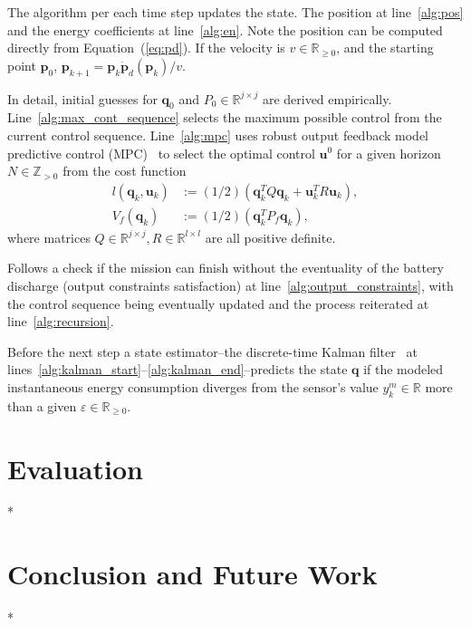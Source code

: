 \documentclass[letterpaper,10pt,conference]{ieeeconf}
\theoremstyle{definition}
\begin{document}
The algorithm per each time step updates the state. The position at line~\ref{alg:pos} and the energy coefficients at line~\ref{alg:en}. Note the position can be computed directly from Equation~(\ref{eq:pd}). If the velocity is $v\in\mathbb{R}_{\geq 0}$, and the starting point $\mathbf{p}_0$, $\mathbf{p}_{k+1}=\mathbf{p}_k\dot{\mathbf{p}}_d(\mathbf{p}_k)/v$.
  
In detail, initial guesses for $\mathbf{q}_0$ and $P_0\in\mathbb{R}^{j\times j}$ are derived empirically. Line~\ref{alg:max_cont_sequence} selects the maximum possible control from the current control sequence. Line~\ref{alg:mpc} uses robust output feedback model predictive control (MPC)~\cite{rawlings2017model} to select the optimal control $\mathbf{u}^0$ for a given horizon $N\in\mathbb{Z}_{>0}$ from the cost function
\begin{equation}\begin{split}
  l(\mathbf{q}_k,\mathbf{u}_k)&:=(1/2)(\mathbf{q}_k^TQ\mathbf{q}_k+\mathbf{u}_k^TR\mathbf{u}_k),\\
  V_f(\mathbf{q}_k)&:=(1/2)(\mathbf{q}_k^TP_f\mathbf{q}_k),
\end{split}\end{equation}
where matrices $Q\in\mathbb{R}^{j\times j},R\in\mathbb{R}^{l\times l}$ are all positive definite.

Follows a check if the mission can finish without the eventuality of the battery discharge (output constraints satisfaction) at line~\ref{alg:output_constraints}, with the control sequence being eventually updated and the process reiterated at line~\ref{alg:recursion}.

Before the next step a state estimator--the discrete-time Kalman filter~\cite{simon2006optimal} at lines~\ref{alg:kalman_start}--\ref{alg:kalman_end}--predicts the state $\mathbf{q}$ if the modeled instantaneous energy consumption diverges from the sensor's value $y_k^m\in\mathbb{R}$ more than a given $\varepsilon\in\mathbb{R}_{\geq  0}$.



\section{Evaluation}
\label{sec:experimental}

*

\section{Conclusion and Future Work}
\label{sec:conclusion}

*


 
\vspace{0.1ex}

\newpage
\end{document}
